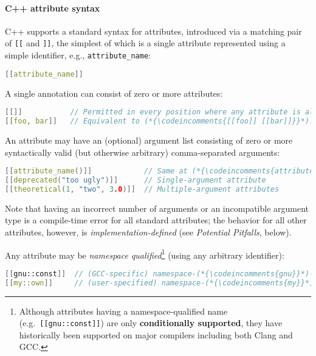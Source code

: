 \documentclass[twoside,10pt,letterpaper,usenames]{newstyle-PearsonGeneric-7-38}
\newcommand{\codeincomments}{\color{skyblue}\ttfamily}
\newcommand{\intraref}[1]{\textit{#1}}
\begin{document}
\paragraph[C++ attribute syntax]{C++ attribute syntax}\label{c++-attribute-syntax}

C++ supports a standard syntax for attributes, introduced via a matching
pair of \texttt{[[} and \texttt{]]}, the simplest of which is a single
attribute represented using a simple identifier, e.g.,
\texttt{attribute\_name}:

\begin{lstlisting}[language=C++]
[[attribute_name]]
\end{lstlisting}
    

A single annotation can consist of zero or more attributes:

\begin{lstlisting}[language=C++]
[[]]           // Permitted in every position where any attribute is allowed.
[[foo, bar]]   // Equivalent to (*{\codeincomments{[[foo]] [[bar]]}}*).
\end{lstlisting}
    

An attribute may have an (optional) argument list consisting of zero or
more syntactically valid (but otherwise arbitrary) comma-separated
arguments:

\begin{lstlisting}[language=C++]
[[attribute_name()]]            // Same at (*{\codeincomments{attribute\_name}}*)
[[deprecated("too ugly")]]      // Single-argument attribute
[[theoretical(1, "two", 3.0)]]  // Multiple-argument attributes
\end{lstlisting}
    

Note that having an incorrect number of arguments or an incompatible
argument type is a compile-time error for all standard attributes; the
behavior for all other attributes, however, is
\emph{implementation-defined} (see {\intraref{{Potential Pitfalls}}},
below).

Any attribute may be \emph{namespace qualified}{\cprotect\footnote{Although
attributes having a namespace-qualified name
(e.g.~\texttt{[[gnu::const]]}) are only \textbf{conditionally
supported}, they have historically been supported on major compilers
including both Clang and GCC.}} (using any arbitrary identifier):

\begin{lstlisting}[language=C++]
[[gnu::const]]  // (GCC-specific) namespace-(*{\codeincomments{gnu}}*)-qualified (*{\codeincomments{const}}*) attribute
[[my::own]]     // (user-specified) namespace-(*{\codeincomments{my}}*)-qualified (*{\codeincomments{own}}*) attribute
\end{lstlisting}
    
\end{document}
